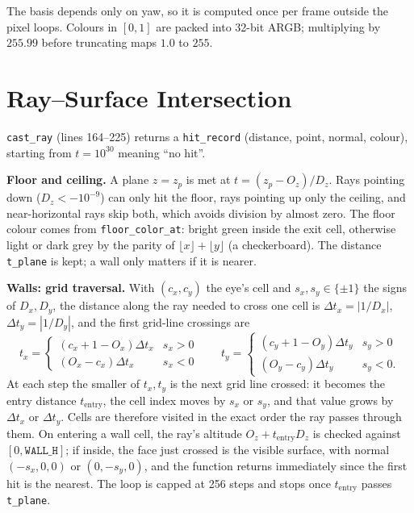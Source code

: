 
The basis depends only on yaw, so it is computed once per frame outside the pixel loops. Colours in $[0,1]$ are packed into 32-bit ARGB; multiplying by $255.99$ before truncating maps $1.0$ to $255$.

\section{Ray--Surface Intersection}

\texttt{cast\_ray} (lines 164--225) returns a \texttt{hit\_record} (distance, point, normal, colour), starting from $t=10^{30}$ meaning ``no hit''.

\textbf{Floor and ceiling.} A plane $z=z_p$ is met at $t=(z_p-O_z)/D_z$. Rays pointing down ($D_z<-10^{-9}$) can only hit the floor, rays pointing up only the ceiling, and near-horizontal rays skip both, which avoids division by almost zero. The floor colour comes from \texttt{floor\_color\_at}: bright green inside the exit cell, otherwise light or dark grey by the parity of $\lfloor x\rfloor+\lfloor y\rfloor$ (a checkerboard). The distance \texttt{t\_plane} is kept; a wall only matters if it is nearer.

\textbf{Walls: grid traversal.} With $(c_x,c_y)$ the eye's cell and $s_x,s_y\in\{\pm1\}$ the signs of $D_x,D_y$, the distance along the ray needed to cross one cell is $\Delta t_x=|1/D_x|$, $\Delta t_y=|1/D_y|$, and the first grid-line crossings are
\begin{equation}
t_x=\begin{cases}(c_x+1-O_x)\Delta t_x & s_x>0\\ (O_x-c_x)\Delta t_x & s_x<0\end{cases}\qquad
t_y=\begin{cases}(c_y+1-O_y)\Delta t_y & s_y>0\\ (O_y-c_y)\Delta t_y & s_y<0.\end{cases}
\end{equation}
At each step the smaller of $t_x,t_y$ is the next grid line crossed: it becomes the entry distance $t_{\text{entry}}$, the cell index moves by $s_x$ or $s_y$, and that value grows by $\Delta t_x$ or $\Delta t_y$. Cells are therefore visited in the exact order the ray passes through them. On entering a wall cell, the ray's altitude $O_z+t_{\text{entry}}D_z$ is checked against $[0,\texttt{WALL\_H}]$; if inside, the face just crossed is the visible surface, with normal $(-s_x,0,0)$ or $(0,-s_y,0)$, and the function returns immediately since the first hit is the nearest. The loop is capped at 256 steps and stops once $t_{\text{entry}}$ passes \texttt{t\_plane}.

